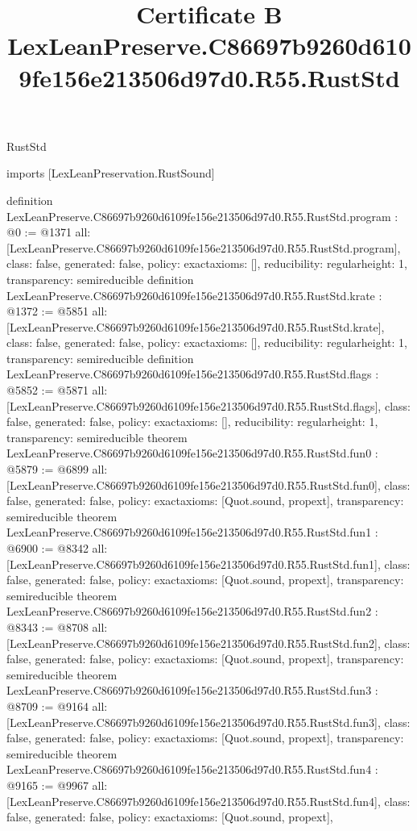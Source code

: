 \begin{lexlean}{RustStd}
\title{Certificate B LexLeanPreserve.C86697b9260d6109fe156e213506d97d0.R55.RustStd}
\begin{coremodule}
imports [LexLeanPreservation.RustSound]

definition LexLeanPreserve.C86697b9260d6109fe156e213506d97d0.R55.RustStd.program : @0 := @1371 {
  all: [LexLeanPreserve.C86697b9260d6109fe156e213506d97d0.R55.RustStd.program],
  class: false,
  generated: false,
  policy: exact{axioms: []},
  reducibility: regular{height: 1},
  transparency: semireducible
}
definition LexLeanPreserve.C86697b9260d6109fe156e213506d97d0.R55.RustStd.krate : @1372 := @5851 {
  all: [LexLeanPreserve.C86697b9260d6109fe156e213506d97d0.R55.RustStd.krate],
  class: false,
  generated: false,
  policy: exact{axioms: []},
  reducibility: regular{height: 1},
  transparency: semireducible
}
definition LexLeanPreserve.C86697b9260d6109fe156e213506d97d0.R55.RustStd.flags : @5852 := @5871 {
  all: [LexLeanPreserve.C86697b9260d6109fe156e213506d97d0.R55.RustStd.flags],
  class: false,
  generated: false,
  policy: exact{axioms: []},
  reducibility: regular{height: 1},
  transparency: semireducible
}
theorem LexLeanPreserve.C86697b9260d6109fe156e213506d97d0.R55.RustStd.fun0 : @5879 := @6899 {
  all: [LexLeanPreserve.C86697b9260d6109fe156e213506d97d0.R55.RustStd.fun0],
  class: false,
  generated: false,
  policy: exact{axioms: [Quot.sound, propext]},
  transparency: semireducible
}
theorem LexLeanPreserve.C86697b9260d6109fe156e213506d97d0.R55.RustStd.fun1 : @6900 := @8342 {
  all: [LexLeanPreserve.C86697b9260d6109fe156e213506d97d0.R55.RustStd.fun1],
  class: false,
  generated: false,
  policy: exact{axioms: [Quot.sound, propext]},
  transparency: semireducible
}
theorem LexLeanPreserve.C86697b9260d6109fe156e213506d97d0.R55.RustStd.fun2 : @8343 := @8708 {
  all: [LexLeanPreserve.C86697b9260d6109fe156e213506d97d0.R55.RustStd.fun2],
  class: false,
  generated: false,
  policy: exact{axioms: [Quot.sound, propext]},
  transparency: semireducible
}
theorem LexLeanPreserve.C86697b9260d6109fe156e213506d97d0.R55.RustStd.fun3 : @8709 := @9164 {
  all: [LexLeanPreserve.C86697b9260d6109fe156e213506d97d0.R55.RustStd.fun3],
  class: false,
  generated: false,
  policy: exact{axioms: [Quot.sound, propext]},
  transparency: semireducible
}
theorem LexLeanPreserve.C86697b9260d6109fe156e213506d97d0.R55.RustStd.fun4 : @9165 := @9967 {
  all: [LexLeanPreserve.C86697b9260d6109fe156e213506d97d0.R55.RustStd.fun4],
  class: false,
  generated: false,
  policy: exact{axioms: [Quot.sound, propext]},
}
\end{coremodule}
\end{lexlean}
